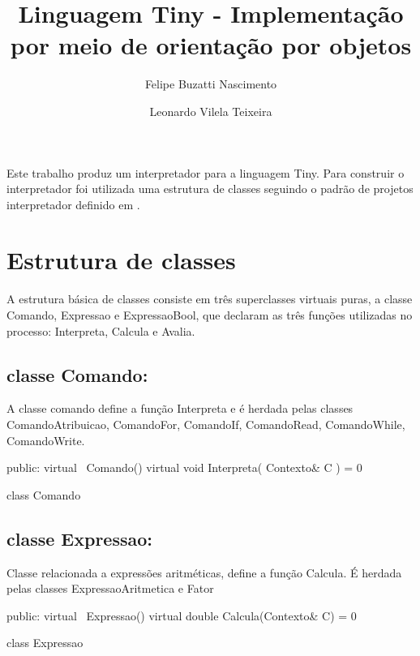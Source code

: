 \documentclass[12pt]{article}
\title{Linguagem Tiny - Implementação por meio de orientação por objetos}
\author{Felipe Buzatti Nascimento \and Leonardo Vilela Teixeira}
\begin{document}
 

\maketitle

\begin{resumo} 
Este trabalho produz um interpretador para a linguagem Tiny. Para construir o interpretador foi utilizada uma estrutura de classes seguindo o padrão de projetos interpretador definido em \cite{GoF}.
\end{resumo}


\section{Estrutura de classes}

A estrutura básica de classes consiste em três superclasses virtuais puras, a classe Comando, Expressao e ExpressaoBool, que declaram as três funções utilizadas no processo: Interpreta, Calcula e Avalia.

\subsection{classe Comando:} 

A classe comando define a função Interpreta e é herdada pelas classes ComandoAtribuicao, ComandoFor, ComandoIf, ComandoRead, ComandoWhile, ComandoWrite.
\begin{algorithm}[h!]
\begin{footnotesize}

	public: 
		virtual ~Comando() {}\;
		virtual void Interpreta( Contexto\& C ) = 0\;

\caption{class Comando}%
\end{footnotesize}
\end{algorithm}

\subsection{classe Expressao:} 

Classe relacionada a expressões aritméticas, define a função Calcula. É herdada pelas classes ExpressaoAritmetica e Fator
\begin{algorithm}[h!]
\begin{footnotesize}
  
	public: 
		virtual ~Expressao() {}\;
		virtual double Calcula(Contexto\& C) = 0\;
	
\caption{class Expressao}%
\end{footnotesize}
\end{algorithm}
\end{document}
